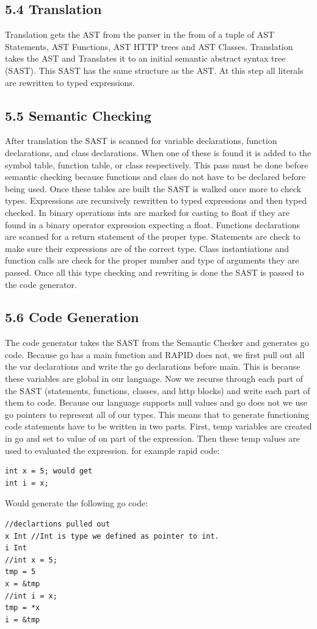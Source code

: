 \subsection*{5.4 Translation}

Translation gets the AST from the parser in the from of a tuple of AST Statements, AST Functions, AST HTTP trees and AST Classes.  Translation takes the AST and Translates it to an initial semantic abstract syntax tree (SAST). This SAST has the same structure as the AST.  At this step all literals are rewritten to typed expressions.  

\subsection*{5.5 Semantic Checking}

After translation the SAST is scanned for variable declarations, function declarations, and class declarations.  When one of these is found it is added to the symbol table, function table, or class respectively.  This pass must be done before semantic checking because functions and class do not have to be declared before being used.  Once these tables are built the SAST is walked once more to check types.  Expressions are recursively rewritten to typed expressions and then typed checked. In binary operations ints are marked for casting to float if they are found in a binary operator expression expecting a float.  Functions declarations are scanned for a return statement of the proper type.  Statements are check to make sure their expressions are of the correct type.  Class instantiations and function calls are check for the proper number and type of arguments they are passed.  Once all this type checking and rewriting is done the SAST is passed to the code generator.

\subsection*{5.6 Code Generation}

The code generator takes the SAST from the Semantic Checker and generates go code.  Because go has a main function and RAPID does not, we first pull out all the var declarations and write the go declarations before main. This is because these variables are global in our language. Now we recurse through each part of the SAST (statements, functions, classes, and http blocks) and write each part of them to code.  Because our language supports null values and go does not we use go pointers to represent all of our types.  This means that to generate functioning code statements have to be written in two parts.  First, temp variables are created in go and set to value of on part of the expression.  Then these temp values are used to evaluated the expression.  for example rapid code:
\begin{verbatim}
int x = 5; would get 
int i = x;
\end{verbatim}

Would generate the following go code:
\begin{verbatim}
//declartions pulled out
x Int //Int is type we defined as pointer to int.
i Int
//int x = 5; 
tmp = 5
x = &tmp
//int i = x;
tmp = *x
i = &tmp
\end{verbatim} 
